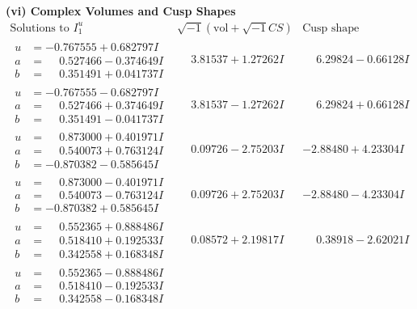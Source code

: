 \documentclass[1p]{elsarticle_modified}
\theoremstyle{definition}
\newcommand{\I}{\sqrt{-1}}
\begin{document}
\newpage\flushleft \textbf{(vi) Complex Volumes and Cusp Shapes}
$$\begin{array}{c|c|c}  
\text{Solutions to }I^u_{1}& \I (\text{vol} + \sqrt{-1}CS) & \text{Cusp shape}\\
 \hline 
\begin{aligned}
u &= -0.767555 + 0.682797 I \\
a &= \phantom{-}0.527466 - 0.374649 I \\
b &= \phantom{-}0.351491 + 0.041737 I\end{aligned}
 & \phantom{-}3.81537 + 1.27262 I & \phantom{-}6.29824 - 0.66128 I \\ \hline\begin{aligned}
u &= -0.767555 - 0.682797 I \\
a &= \phantom{-}0.527466 + 0.374649 I \\
b &= \phantom{-}0.351491 - 0.041737 I\end{aligned}
 & \phantom{-}3.81537 - 1.27262 I & \phantom{-}6.29824 + 0.66128 I \\ \hline\begin{aligned}
u &= \phantom{-}0.873000 + 0.401971 I \\
a &= \phantom{-}0.540073 + 0.763124 I \\
b &= -0.870382 - 0.585645 I\end{aligned}
 & \phantom{-}0.09726 - 2.75203 I & -2.88480 + 4.23304 I \\ \hline\begin{aligned}
u &= \phantom{-}0.873000 - 0.401971 I \\
a &= \phantom{-}0.540073 - 0.763124 I \\
b &= -0.870382 + 0.585645 I\end{aligned}
 & \phantom{-}0.09726 + 2.75203 I & -2.88480 - 4.23304 I \\ \hline\begin{aligned}
u &= \phantom{-}0.552365 + 0.888486 I \\
a &= \phantom{-}0.518410 + 0.192533 I \\
b &= \phantom{-}0.342558 + 0.168348 I\end{aligned}
 & \phantom{-}0.08572 + 2.19817 I & \phantom{-}0.38918 - 2.62021 I \\ \hline\begin{aligned}
u &= \phantom{-}0.552365 - 0.888486 I \\
a &= \phantom{-}0.518410 - 0.192533 I \\
b &= \phantom{-}0.342558 - 0.168348 I\end{aligned}

\end{array}$$
\end{document}
